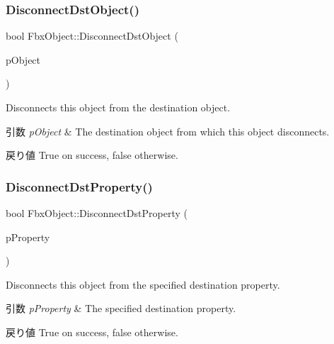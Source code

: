 \subsubsection{\texorpdfstring{Disconnect\+Dst\+Object()}{DisconnectDstObject()}}
{\footnotesize\ttfamily bool Fbx\+Object\+::\+Disconnect\+Dst\+Object (\begin{DoxyParamCaption}\item[{\hyperlink{class_fbx_object}{Fbx\+Object} $\ast$}]{p\+Object }\end{DoxyParamCaption})}

Disconnects this object from the destination object. 
\begin{DoxyParams}{引数}
{\em p\+Object} & The destination object from which this object disconnects. \\
\hline
\end{DoxyParams}
\begin{DoxyReturn}{戻り値}
{\ttfamily True} on success, {\ttfamily false} otherwise. 
\end{DoxyReturn}
\mbox{\label{class_fbx_object_a0931b1e490684c4ff0532d69a466b4b2}} 
\subsubsection{\texorpdfstring{Disconnect\+Dst\+Property()}{DisconnectDstProperty()}}
{\footnotesize\ttfamily bool Fbx\+Object\+::\+Disconnect\+Dst\+Property (\begin{DoxyParamCaption}\item[{const \hyperlink{class_fbx_property}{Fbx\+Property} \&}]{p\+Property }\end{DoxyParamCaption})}

Disconnects this object from the specified destination property. 
\begin{DoxyParams}{引数}
{\em p\+Property} & The specified destination property. \\
\hline
\end{DoxyParams}
\begin{DoxyReturn}{戻り値}
{\ttfamily True} on success, {\ttfamily false} otherwise. 
\end{DoxyReturn}
\mbox{\label{class_fbx_object_a1ff942832a9a9d829988c757899b6655}} 
